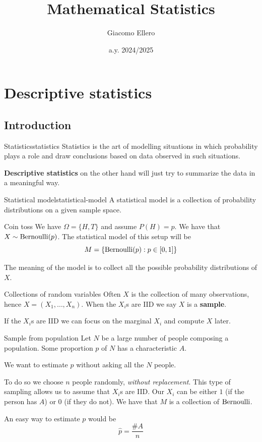 \documentclass[12pt]{extarticle}
\title{Mathematical Statistics}
\author{Giacomo Ellero}
\date{a.y. 2024/2025}
\newcommand{\Bernoulli}{{\operatorfont Bernoulli}}
\begin{document}
\firstpage

\section{Descriptive statistics}

\subsection{Introduction}

\begin{definition}{Statistics}{statistics}
	Statistics is the art of modelling situations in which probability plays a role and draw conclusions based on data observed in such situations.
\end{definition}

\textbf{Descriptive statistics} on the other hand will just try to summarize the data in a meaningful way.

\begin{definition}{Statistical model}{statistical-model}
	A statistical model is a collection of probability distributions on a given sample space.
\end{definition}

\begin{example}{Coin toss}
	We have $\Omega = \{ H, T \}$ and assume $P(H) = p$. We have that $X \sim \Bernoulli(p)$. The statistical model of this setup will be
	\begin{equation}
		M = \{ \Bernoulli(p) : p \in [0, 1] \}
	\end{equation}
\end{example}

The meaning of the model is to collect all the possible probability distributions of $X$.

\begin{remark}{Collections of random variables}{}
	Often $X$ is the collection of many observations, hence $X = (X_1, \dots, X_n)$.
	When the $X_i$s are IID we say $X$ is a \textbf{sample}.
\end{remark}

If the $X_i$s are IID we can focus on the marginal $X_i$ and compute $X$ later.

\begin{example}{Sample from population}{}
	Let $N$ be a large number of people composing a population.
	Some proportion $p$ of $N$ has a characteristic $A$.

	We want to estimate $p$ without asking all the $N$ people.

	To do so we choose $n$ people randomly, \textit{without replacement}.
	This type of sampling allows us to assume that $X_i$s are IID.
	Our $X_i$ can be either $1$ (if the person has $A$) or $0$ (if they do not).
	We have that $M$ is a collection of $\Bernoulli$.

	An easy way to estimate $p$ would be
	\begin{equation}
		\hat p = \frac{\# A}{n}
	\end{equation}
\end{example}
\end{document}

